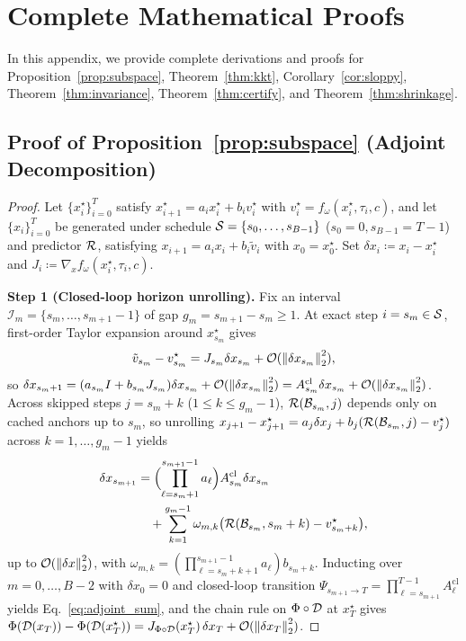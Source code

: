 \section{Complete Mathematical Proofs}
\label{app:proofs}

In this appendix, we provide complete derivations and proofs for Proposition~\ref{prop:subspace}, Theorem~\ref{thm:kkt}, Corollary~\ref{cor:sloppy}, Theorem~\ref{thm:invariance}, Theorem~\ref{thm:certify}, and Theorem~\ref{thm:shrinkage}.

\subsection{Proof of Proposition~\ref{prop:subspace} (Adjoint Decomposition)}
\label{app:proof_prop1}

\begin{proof}
Let $\{x_i^\star\}_{i=0}^T$ satisfy $x_{i+1}^\star = a_i x_i^\star + b_i v_i^\star$ with $v_i^\star = f_\omega(x_i^\star, \tau_i, c)$, and let $\{x_i\}_{i=0}^T$ be generated under schedule $\mathcal{S} = \{s_0, \dots, s_{B-1}\}$ ($s_0 = 0, s_{B-1} = T-1$) and predictor $\mathcal{R}$, satisfying $x_{i+1} = a_i x_i + b_i \tilde{v}_i$ with $x_0 = x_0^\star$. Set $\delta x_i \coloneqq x_i - x_i^\star$ and $J_i \coloneqq \nabla_x f_\omega(x_i^\star, \tau_i, c)$.

\textbf{Step 1 (Closed-loop horizon unrolling).}
Fix an interval $\mathcal{I}_m = \{s_m, \dots, s_{m+1} - 1\}$ of gap $g_m = s_{m+1} - s_m \ge 1$. At exact step $i = s_m \in \mathcal{S}$, first-order Taylor expansion around $x_{s_m}^\star$ gives
\begin{equation}
\tilde{v}_{s_m} - v_{s_m}^\star = J_{s_m} \delta x_{s_m} + \mathcal{O}(\left\lVert \delta x_{s_m} \right\rVert_2^2),
\end{equation}
so $\delta x_{s_m + 1} = (a_{s_m} I + b_{s_m} J_{s_m})\delta x_{s_m} + \mathcal{O}(\left\lVert \delta x_{s_m} \right\rVert_2^2) = A_{s_m}^{\mathrm{cl}} \delta x_{s_m} + \mathcal{O}(\left\lVert \delta x_{s_m} \right\rVert_2^2)$. Across skipped steps $j = s_m + k$ ($1 \le k \le g_m - 1$), $\mathcal{R}(\mathcal{B}_{s_m}, j)$ depends only on cached anchors up to $s_m$, so unrolling $x_{j+1} - x_{j+1}^\star = a_j \delta x_j + b_j(\mathcal{R}(\mathcal{B}_{s_m}, j) - v_j^\star)$ across $k = 1, \dots, g_m - 1$ yields
\begin{equation}
\begin{aligned}
\delta x_{s_{m+1}} &= \Bigl(\prod_{\ell = s_m + 1}^{s_{m+1}-1} a_\ell\Bigr) A_{s_m}^{\mathrm{cl}} \delta x_{s_m} \\
&\quad + \sum_{k=1}^{g_m - 1} \omega_{m,k} \bigl(\mathcal{R}(\mathcal{B}_{s_m}, s_m + k) - v_{s_m + k}^\star\bigr),
\end{aligned}
\end{equation}
up to $\mathcal{O}(\left\lVert \delta x \right\rVert_2^2)$, with $\omega_{m,k} = (\prod_{\ell=s_m+k+1}^{s_{m+1}-1} a_\ell) b_{s_m+k}$. Inducting over $m = 0, \dots, B - 2$ with $\delta x_0 = 0$ and closed-loop transition $\Psi_{s_{m+1}\to T} = \prod_{\ell=s_{m+1}}^{T-1} A_\ell^{\mathrm{cl}}$ yields Eq.~\eqref{eq:adjoint_sum}, and the chain rule on $\Phi \circ \mathcal{D}$ at $x_T^\star$ gives $\Phi(\mathcal{D}(x_T)) - \Phi(\mathcal{D}(x_T^\star)) = J_{\Phi \circ \mathcal{D}}(x_T^\star)\,\delta x_T + \mathcal{O}(\left\lVert \delta x_T \right\rVert_2^2)$.


\end{proof}
